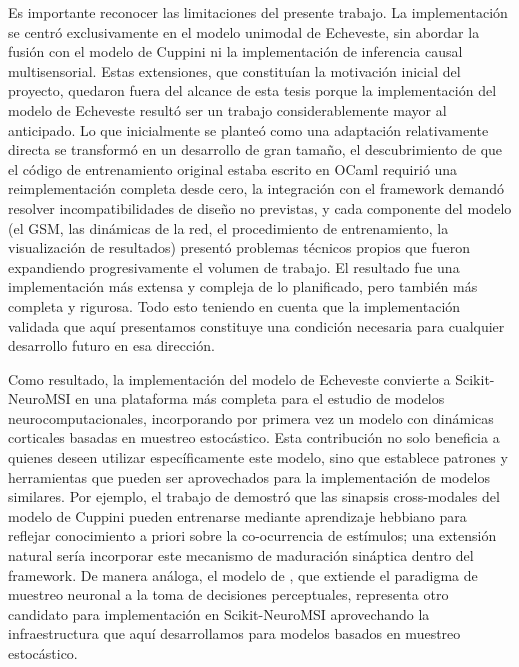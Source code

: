 Es importante reconocer las limitaciones del presente trabajo. La implementación se centró exclusivamente en el modelo unimodal de Echeveste, sin abordar la fusión con el modelo de Cuppini ni la implementación de inferencia causal multisensorial. Estas extensiones, que constituían la motivación inicial del proyecto, quedaron fuera del alcance de esta tesis porque la implementación del modelo de Echeveste resultó ser un trabajo considerablemente mayor al anticipado. Lo que inicialmente se planteó como una adaptación relativamente directa se transformó en un desarrollo de gran tamaño, el descubrimiento de que el código de entrenamiento original estaba escrito en OCaml requirió una reimplementación completa desde cero, la integración con el framework demandó resolver incompatibilidades de diseño no previstas, y cada componente del modelo (el \acrshort{GSM}, las dinámicas de la red, el procedimiento de entrenamiento, la visualización de resultados) presentó problemas técnicos propios que fueron expandiendo progresivamente el volumen de trabajo. El resultado fue una implementación más extensa y compleja de lo planificado, pero también más completa y rigurosa. Todo esto teniendo en cuenta que la implementación validada que aquí presentamos constituye una condición necesaria para cualquier desarrollo futuro en esa dirección.

Como resultado, la implementación del modelo de Echeveste convierte a Scikit-NeuroMSI en una plataforma más completa para el estudio de modelos neurocomputacionales, incorporando por primera vez un modelo con dinámicas corticales basadas en muestreo estocástico. Esta contribución no solo beneficia a quienes deseen utilizar específicamente este modelo, sino que establece patrones y herramientas que pueden ser aprovechados para la implementación de modelos similares. Por ejemplo, el trabajo de \citet{ursino2017multisensory} demostró que las sinapsis cross-modales del modelo de Cuppini pueden entrenarse mediante aprendizaje hebbiano para reflejar conocimiento a priori sobre la co-ocurrencia de estímulos; una extensión natural sería incorporar este mecanismo de maduración sináptica dentro del framework. De manera análoga, el modelo de \citet{haefner2016perceptual}, que extiende el paradigma de muestreo neuronal a la toma de decisiones perceptuales, representa otro candidato para implementación en Scikit-NeuroMSI aprovechando la infraestructura que aquí desarrollamos para modelos basados en muestreo estocástico.


